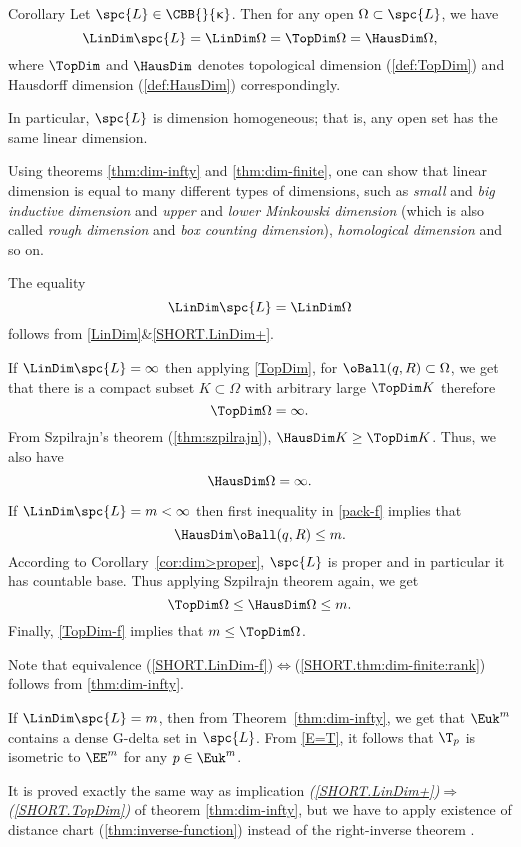 \begin{thm}{Corollary}\label{dim=dim} 
Let $\spc{L}\in\CBB{}{\kappa}$. 
Then for any open $\Omega\subset \spc{L}$, we have
\[
\LinDim \spc{L}=
\LinDim\Omega =
\TopDim\Omega=
\HausDim\Omega,
\]
where $\TopDim$ and $\HausDim$ denotes  topological dimension (\ref{def:TopDim}) and Hausdorff dimension (\ref{def:HausDim}) correspondingly.

In particular, $\spc{L}$ is dimension homogeneous; that is, any open set has the same linear dimension.
\end{thm}



Using theorems \ref{thm:dim-infty} and \ref{thm:dim-finite}, 
one can show that linear dimension is equal to many different types of dimensions, such 
as \emph{small} and \emph{big inductive dimension} 
and \emph{upper} and \emph{lower Minkowski dimension} 
(which is also called \emph{rough dimension} and \emph{box counting dimension}), 
\emph{homological dimension} and so on.

The equality
\[\LinDim \spc{L}= \LinDim\Omega\]
follows from \ref{LinDim}$\&$\ref{SHORT.LinDim+}.

If $\LinDim \spc{L}=\infty$ then
applying  \ref{TopDim}, for $\oBall(q,R)\subset \Omega$, we get that there is a compact subset $K\subset \Omega$ with arbitrary large $\TopDim K$ therefore
\[\TopDim\Omega=\infty.\] 
From Szpilrajn's theorem (\ref{thm:szpilrajn}),
$\HausDim K\ge \TopDim K$.
Thus, we also have 
\[\HausDim\Omega=\infty.\]

If $\LinDim \spc{L}=m<\infty$ then first inequality in \ref{pack-f} 
implies that \[\HausDim \oBall(q,R)\le m.\] 
According to Corollary~\ref{cor:dim>proper}, 
$\spc{L}$ is proper and in particular it has countable base. 
Thus applying Szpilrajn theorem  again, we get
\[\TopDim\Omega\le \HausDim \Omega\le m.\]
Finally, \ref{TopDim-f} implies that $m\le\TopDim\Omega$.
\qeds


 Note that equivalence (\ref{SHORT.LinDim-f})$\Leftrightarrow$(\ref{SHORT.thm:dim-finite:rank}) follows from \ref{thm:dim-infty}.

If $\LinDim\spc{L}=m$, then from Theorem~\ref{thm:dim-infty}, 
we get that $\Euk^m$ contains a dense G-delta set in $\spc{L}$.
From \ref{E=T}, it follows that $\T_p$ is isometric to $\EE^m$ for any $p\in \Euk^m$.

 It is proved exactly the same way as implication \textit{(\ref{SHORT.LinDim+})$\Rightarrow$(\ref{SHORT.TopDim})} of theorem \ref{thm:dim-infty}, 
but we have to apply existence of distance chart (\ref{thm:inverse-function}) instead of the right-inverse theorem%
.

